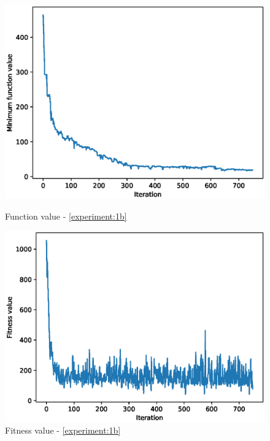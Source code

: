 \documentclass{article}
\begin{document}
\FloatBarrier

\begin{figure}[!htbp]
	\centering
	\begin{minipage}{.48\textwidth}
		\centering
		\includegraphics[scale=.4]{experiment_1b_griewangk/min_eval_0.eps}
		\caption{Function value - \ref{experiment:1b}}
	\end{minipage}\hfill
	\begin{minipage}{.48\textwidth}
		\centering
		\includegraphics[scale=.4]{experiment_1b_griewangk/max_fitness_0.eps}
		\caption{Fitness value - \ref{experiment:1b}}
	\end{minipage}
\end{figure}
\FloatBarrier
\end{document}
